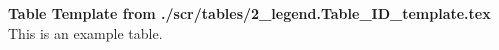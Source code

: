 \caption{\textbf{
Table Template from ./scr/tables/2\_legend.Table\_ID\_template.tex
}
\smallskip
\\
This is an example table.
}
